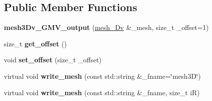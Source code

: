\subsection*{Public Member Functions}
\begin{DoxyCompactItemize}
\item 
\mbox{\label{classStemMesh3D_1_1mesh3Dv__GMV__output_a4ed545dca6daece2b389ef3745a6b0ef}} 
{\bfseries mesh3\+Dv\+\_\+\+G\+M\+V\+\_\+output} (\hyperlink{classStemMesh3D_1_1mesh__3Dv}{mesh\+\_\+Dv} \&\+\_\+mesh, size\+\_\+t \+\_\+offset=1)
\item 
\mbox{\label{classStemMesh3D_1_1mesh3Dv__GMV__output_a557babacbbf54f53b419a70d3c2a50ff}} 
size\+\_\+t {\bfseries get\+\_\+offset} ()
\item 
\mbox{\label{classStemMesh3D_1_1mesh3Dv__GMV__output_a2848ab52b3ba3f2c885ea7c8289bb73b}} 
void {\bfseries set\+\_\+offset} (size\+\_\+t \+\_\+offset)
\item 
\mbox{\label{classStemMesh3D_1_1mesh3Dv__GMV__output_a0fee2008918f08e40ca3cc2a88ea78ea}} 
virtual void {\bfseries write\+\_\+mesh} (const std\+::string \&\+\_\+fname=\char`\"{}mesh3D\char`\"{})
\item 
\mbox{\label{classStemMesh3D_1_1mesh3Dv__GMV__output_a3419bddbef9c09ef2030aa46072c2b79}} 
virtual void {\bfseries write\+\_\+mesh} (const std\+::string \&\+\_\+fname, size\+\_\+t iR)
\end{DoxyCompactItemize}
